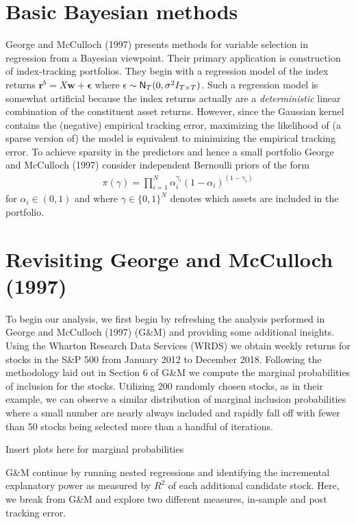 \documentclass[a4paper, 12pt]{article}
\theoremstyle{plain}
\theoremstyle{definition}
\theoremstyle{remark}
\newcommand{\nm}{{\sf N}}
\begin{document}
\section{Basic Bayesian methods}

George and McCulloch (1997) presents methods for variable selection in regression from a Bayesian viewpoint.  Their primary application is construction of index-tracking portfolios.  They begin with a regression model of the index returns
$\mathbf{r}^b = X \mathbf{w} + \mathbf{\epsilon}$
where $\mathbf{\epsilon}\sim \nm_T(0,\sigma^2I_{T\times T})$.  Such a regression model is somewhat artificial because the index returns actually are a \emph{deterministic} linear combination of the constituent asset returns.  However, since the Gaussian kernel contains the (negative) empirical tracking error, maximizing the likelihood of (a sparse version of) the model is equivalent to minimizing the empirical tracking error.  To achieve sparsity in the predictors and hence a small portfolio George and McCulloch (1997) consider independent Bernoulli priors of the form
\begin{align}
\pi(\gamma) = \prod_{i=1}^N\alpha_i^{\gamma_i}(1-\alpha_i)^{(1-\gamma_i)}
\end{align}
for $\alpha_i\in(0,1)$ and where $\gamma \in \{0,1\}^N$ denotes which assets are included in the portfolio.  


\section{Revisiting George and McCulloch (1997)}

To begin our analysis, we first begin by refreshing the analysis performed in George and McCulloch (1997) (G\&M) and providing some additional insights. Using the Wharton Research Data Services (WRDS) we obtain weekly returns for stocks in the S\&P 500 from January 2012 to December 2018. Following the methodology laid out in Section 6 of G\&M we compute the marginal probabilities of inclusion for the stocks. Utilizing 200 randomly chosen stocks, as in their example, we can observe a similar distribution of marginal inclusion probabilities where a small number are nearly always included and rapidly fall off with fewer than 50 stocks being selected more than a handful of iterations.

{\color{red} Insert plots here for marginal probabilities}

G\&M continue by running nested regressions and identifying the incremental explanatory power as measured by $R^2$ of each additional candidate stock. Here, we break from G\&M and explore two different measures, in-sample and post tracking error.
\end{document}
